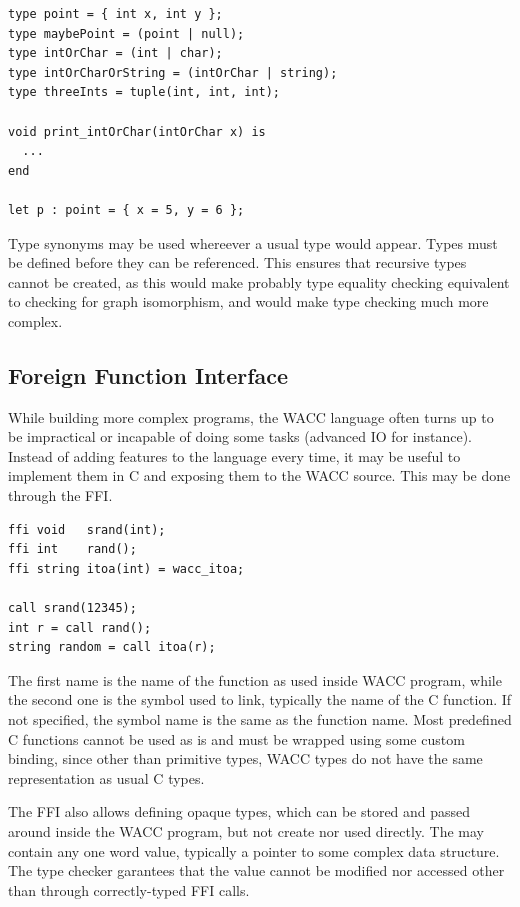 \documentclass{article}
\begin{document}
\begin{lstlisting}
type point = { int x, int y };
type maybePoint = (point | null);
type intOrChar = (int | char);
type intOrCharOrString = (intOrChar | string);
type threeInts = tuple(int, int, int);

void print_intOrChar(intOrChar x) is
  ...
end

let p : point = { x = 5, y = 6 };
\end{lstlisting}

Type synonyms may be used whereever a usual type would appear.
Types must be defined before they can be referenced. This ensures that recursive types cannot be created, as this would make
probably type equality checking equivalent to checking for graph isomorphism, and would make type checking much more complex.

\subsection{Foreign Function Interface}
While building more complex programs, the WACC language often turns up to be impractical or incapable of doing some tasks
(advanced IO for instance). Instead of adding features to the language every time, it may be useful to implement them in C
and exposing them to the WACC source. This may be done through the FFI.

\begin{lstlisting}
ffi void   srand(int);
ffi int    rand();
ffi string itoa(int) = wacc_itoa;

call srand(12345);
int r = call rand();
string random = call itoa(r);
\end{lstlisting}

The first name is the name of the function as used inside WACC program, while the second one is the symbol used to link,
typically the name of the C function. If not specified, the symbol name is the same as the function name.
Most predefined C functions cannot be used as is and must be wrapped using some custom binding, since other than primitive
types, WACC types do not have the same representation as usual C types.

The FFI also allows defining opaque types, which can be stored and passed around inside the WACC program, but not create nor
used directly. The may contain any one word value, typically a pointer to some complex data structure. The type checker
garantees that the value cannot be modified nor accessed other than through correctly-typed FFI calls.
\end{document}
